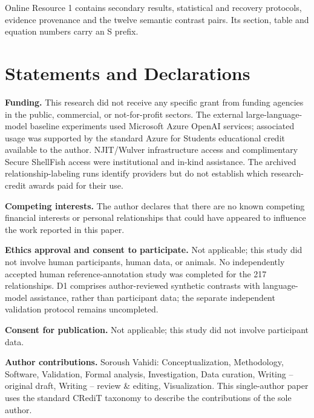 \documentclass[pdflatex,iicol,sn-basic,Numbered]{sn-jnl}
\begin{document}
Online Resource 1 contains secondary results, statistical and recovery protocols, evidence provenance and the twelve semantic contrast pairs. Its section, table and equation numbers carry an S prefix.


\section*{Statements and Declarations}

\noindent\textbf{Funding.} This research did not receive any specific grant from funding agencies in the public, commercial, or not-for-profit sectors. The external large-language-model baseline experiments used Microsoft Azure OpenAI services; associated usage was supported by the standard Azure for Students educational credit available to the author. NJIT/Wulver infrastructure access and complimentary Secure ShellFish access were institutional and in-kind assistance. The archived relationship-labeling runs identify providers but do not establish which research-credit awards paid for their use.

\noindent\textbf{Competing interests.} The author declares that there are no known competing financial interests or personal relationships that could have appeared to influence the work reported in this paper.

\noindent\textbf{Ethics approval and consent to participate.} Not applicable; this study did not involve human participants, human data, or animals. No independently accepted human reference-annotation study was completed for the 217 relationships. D1 comprises author-reviewed synthetic contrasts with language-model assistance, rather than participant data; the separate independent validation protocol remains uncompleted.

\noindent\textbf{Consent for publication.} Not applicable; this study did not involve participant data.

\noindent\textbf{Author contributions.} Soroush Vahidi: Conceptualization, Methodology, Software, Validation, Formal analysis, Investigation, Data curation, Writing -- original draft, Writing -- review \& editing, Visualization. This single-author paper uses the standard CRediT taxonomy to describe the contributions of the sole author.
\end{document}
